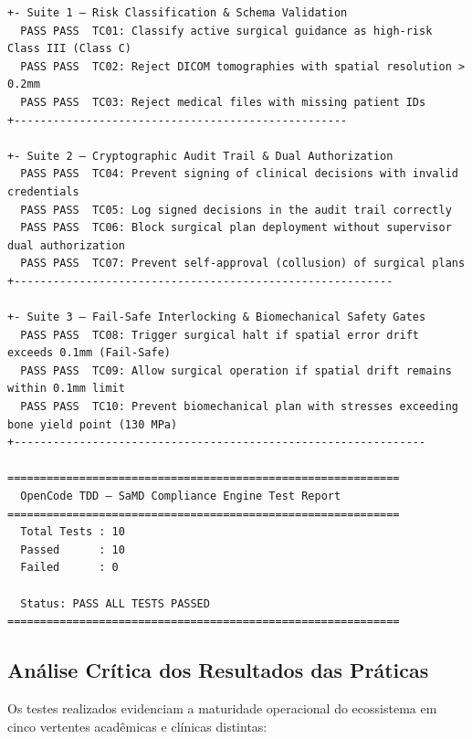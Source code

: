 \begin{lstlisting}[style=bashstyle, caption={Saída do Executor de Testes do SaMD Compliance Engine}, label={lst:tdd_samd_output}]
+- Suite 1 — Risk Classification & Schema Validation
  PASS PASS  TC01: Classify active surgical guidance as high-risk Class III (Class C)
  PASS PASS  TC02: Reject DICOM tomographies with spatial resolution > 0.2mm
  PASS PASS  TC03: Reject medical files with missing patient IDs
+---------------------------------------------------

+- Suite 2 — Cryptographic Audit Trail & Dual Authorization
  PASS PASS  TC04: Prevent signing of clinical decisions with invalid credentials
  PASS PASS  TC05: Log signed decisions in the audit trail correctly
  PASS PASS  TC06: Block surgical plan deployment without supervisor dual authorization
  PASS PASS  TC07: Prevent self-approval (collusion) of surgical plans
+----------------------------------------------------------

+- Suite 3 — Fail-Safe Interlocking & Biomechanical Safety Gates
  PASS PASS  TC08: Trigger surgical halt if spatial error drift exceeds 0.1mm (Fail-Safe)
  PASS PASS  TC09: Allow surgical operation if spatial drift remains within 0.1mm limit
  PASS PASS  TC10: Prevent biomechanical plan with stresses exceeding bone yield point (130 MPa)
+---------------------------------------------------------------

============================================================
  OpenCode TDD — SaMD Compliance Engine Test Report
============================================================
  Total Tests : 10
  Passed      : 10
  Failed      : 0

  Status: PASS ALL TESTS PASSED
============================================================
\end{lstlisting}

\subsection{Análise Crítica dos Resultados das Práticas}

Os testes realizados evidenciam a maturidade operacional do ecossistema em cinco vertentes acadêmicas e clínicas distintas:

